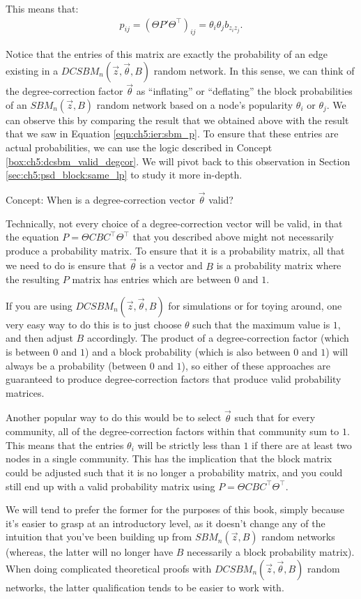 This means that:
\begin{align*}
    p_{ij} = (\Theta P' \Theta^\top)_{ij} = \theta_i \theta_j b_{z_i z_j}.
\end{align*}

Notice that the entries of this matrix are exactly the probability of an edge existing in a $DCSBM_n(\vec z, \vec \theta, B)$ random network. In this sense, we can think of the degree-correction factor $\vec \theta$ as ``inflating'' or ``deflating'' the block probabilities of an $SBM_n(\vec z, B)$ random network based on a node's popularity $\theta_i$ or $\theta_j$. We can observe this by comparing the result that we obtained above with the result that we saw in Equation \eqref{eqn:ch5:ier:sbm_p}. 
To ensure that these entries are actual probabilities, we can use the logic described in Concept \ref{box:ch5:dcsbm_valid_degcor}. We will pivot back to this observation in Section \ref{sec:ch5:psd_block:same_lp} to study it more in-depth.

\begin{floatingbox}[h]\caption{Concept: When is a degree-correction vector $\vec \theta$ valid?}
\label{box:ch5:dcsbm_valid_degcor}
Technically, not every choice of a degree-correction vector will be valid, in that the equation $P = \Theta CBC^\top \Theta^\top$ that you described above might not {necessarily} produce a probability matrix. To ensure that it is a probability matrix, all that we need to do is ensure that $\vec\theta$ is a vector and $B$ is a probability matrix where the resulting $P$ matrix has entries which are between $0$ and $1$.

If you are using $DCSBM_n(\vec z, \vec \theta, B)$ for simulations or for toying around, one very easy way to do this is to just choose $\theta$ such that the maximum value is $1$, and then adjust $B$ accordingly. The product of a degree-correction factor (which is between $0$ and $1$) and a block probability (which is also between $0$ and $1$) will always be a probability (between $0$ and $1$), so either of these approaches are guaranteed to produce degree-correction factors that produce valid probability matrices.

 Another popular way to do this \cite{Karrer2011Jan,Qin2013Sep} would be to select $\vec \theta$ such that for every community, all of the degree-correction factors within that community sum to $1$. This means that the entries $\theta_i$ will be strictly less than $1$ if there are at least two nodes in a single community. This has the implication that the block matrix could be adjusted such that it is no longer a probability matrix, and you could still end up with a valid probability matrix using $P = \Theta C B C^\top \Theta^\top$. 
 
 We will tend to prefer the former for the purposes of this book, simply because it's easier to grasp at an introductory level, as it doesn't change any of the intuition that you've been building up from $SBM_n(\vec z, B)$ random networks (whereas, the latter will no longer have $B$ necessarily a block probability matrix). When doing complicated theoretical proofs with $DCSBM_n(\vec z, \vec\theta, B)$ random networks, the latter qualification tends to be easier to work with.
\end{floatingbox}

